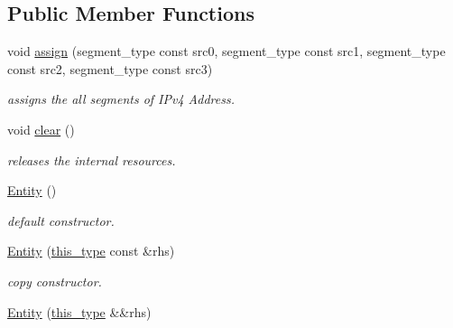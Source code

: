\subsection*{Public Member Functions}
\begin{DoxyCompactItemize}
\item 
\hypertarget{classhryky_1_1ip_1_1v4_1_1_entity_ae6da2a1ca74fa09d1cf13aad4c21dff5}{void \hyperlink{classhryky_1_1ip_1_1v4_1_1_entity_ae6da2a1ca74fa09d1cf13aad4c21dff5}{assign} (segment\-\_\-type const src0, segment\-\_\-type const src1, segment\-\_\-type const src2, segment\-\_\-type const src3)}\label{classhryky_1_1ip_1_1v4_1_1_entity_ae6da2a1ca74fa09d1cf13aad4c21dff5}

\begin{DoxyCompactList}\small\item\em assigns the all segments of I\-Pv4 Address. \end{DoxyCompactList}\item 
\hypertarget{classhryky_1_1ip_1_1v4_1_1_entity_a1f8ab4261c1c312f8a9b8d84d7986921}{void \hyperlink{classhryky_1_1ip_1_1v4_1_1_entity_a1f8ab4261c1c312f8a9b8d84d7986921}{clear} ()}\label{classhryky_1_1ip_1_1v4_1_1_entity_a1f8ab4261c1c312f8a9b8d84d7986921}

\begin{DoxyCompactList}\small\item\em releases the internal resources. \end{DoxyCompactList}\item 
\hyperlink{classhryky_1_1ip_1_1v4_1_1_entity_abc3d6e8285eeeccb5c7e2b817ac57c27}{Entity} ()
\begin{DoxyCompactList}\small\item\em default constructor. \end{DoxyCompactList}\item 
\hypertarget{classhryky_1_1ip_1_1v4_1_1_entity_a5d688a03c9b90003ea354d4e463f83f8}{\hyperlink{classhryky_1_1ip_1_1v4_1_1_entity_a5d688a03c9b90003ea354d4e463f83f8}{Entity} (\hyperlink{classhryky_1_1ip_1_1v4_1_1_entity_a0ac5c55710070f7c540a5243bcfa8836}{this\-\_\-type} const \&rhs)}\label{classhryky_1_1ip_1_1v4_1_1_entity_a5d688a03c9b90003ea354d4e463f83f8}

\begin{DoxyCompactList}\small\item\em copy constructor. \end{DoxyCompactList}\item 
\hypertarget{classhryky_1_1ip_1_1v4_1_1_entity_ade4f7f8c78b07ef4a641502b84dd1776}{\hyperlink{classhryky_1_1ip_1_1v4_1_1_entity_ade4f7f8c78b07ef4a641502b84dd1776}{Entity} (\hyperlink{classhryky_1_1ip_1_1v4_1_1_entity_a0ac5c55710070f7c540a5243bcfa8836}{this\-\_\-type} \&\&rhs)}\label{classhryky_1_1ip_1_1v4_1_1_entity_ade4f7f8c78b07ef4a641502b84dd1776}


\end{DoxyCompactItemize}
